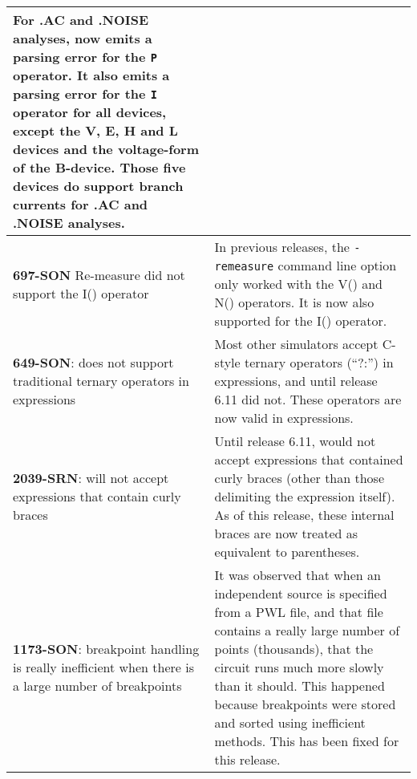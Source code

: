 {\begin{longtable}[h] {>{\raggedright\small}m{2in}|>{\raggedright\let\\\tabularnewline\small}m{3.5in}}
For .AC and .NOISE analyses,  \Xyce{} now emits a parsing error for the \texttt{P}
operator.  It also emits a parsing error for the \texttt{I} operator for all devices,
except the V, E, H and L devices and the voltage-form of the B-device.  Those five
devices do support branch currents for .AC and .NOISE analyses. \\ \hline

\textbf{697-SON} Re-measure did not support the  I() operator & In previous \Xyce{} 
releases, the \texttt{-remeasure} command line option only worked with the V() 
and N() operators.  It is now also supported for the I() operator. \\ \hline 

\textbf{649-SON}: \Xyce{} does not support traditional ternary operators in expressions &
 Most other simulators accept C-style ternary operators (``?:'') in
 expressions, and until release 6.11 \Xyce{} did not.  These operators
 are now valid in \Xyce{} expressions. \\ \hline

\textbf{2039-SRN}: \Xyce{} will not accept expressions that contain curly braces &
  Until release 6.11, \Xyce{} would not accept expressions that
  contained curly braces (other than those delimiting the expression
  itself).  As of this release, these internal braces are now treated
  as equivalent to parentheses.  \\ \hline


\textbf{1173-SON}: breakpoint handling is really inefficient when there is a large number of breakpoints &  It was observed that when an independent source is specified from a PWL file, and that file contains a really large number of points (thousands), that the circuit runs much more slowly than it should.  This happened because breakpoints were stored and sorted using inefficient methods.  This has been fixed for this release.

\end{longtable}
}
